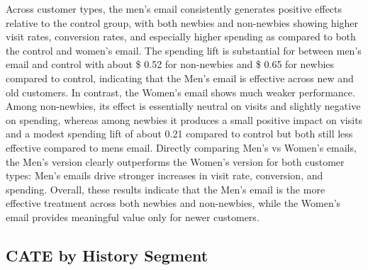 \documentclass[10pt]{article}
\begin{document}
Across customer types, the men’s email consistently generates positive effects relative to the control group, with both newbies and non-newbies showing higher visit rates, conversion rates, and especially higher spending as compared to both the control and women's email. The spending lift is substantial for between men's email and control with about \$ 0.52 for non-newbies and \$ 0.65 for newbies compared to control, indicating that the Men’s email is effective across new and old customers. In contrast, the Women’s email shows much weaker performance. Among non-newbies, its effect is essentially neutral on visits and slightly negative on spending, whereas among newbies it produces a small positive impact on visits and a modest spending lift of about 0.21 compared to control but both still less effective compared to mens email. Directly comparing Men’s vs Women’s emails, the Men’s version clearly outperforms the Women’s version for both customer types: Men’s emails drive stronger increases in visit rate, conversion, and spending. Overall, these results indicate that the Men’s email is the more effective treatment across both newbies and non-newbies, while the Women’s email provides meaningful value only for newer customers.


\subsection{CATE by History Segment}
\end{document}
